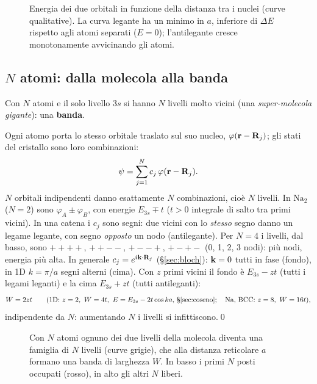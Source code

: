 \documentclass[11pt,a4paper]{article}
\begin{document}
\begin{figure}[tbp]
\centering
{}
\caption{Energia dei due orbitali in funzione della distanza tra i nuclei (curve qualitative). La curva legante ha un minimo in $a$, inferiore
di $\Delta E$ rispetto agli atomi separati ($E=0$); l'antilegante cresce monotonamente avvicinando gli atomi.}\label{fig:na2e}
\end{figure}

\subsection{$N$ atomi: dalla molecola alla banda}
Con $N$ atomi e il solo livello $3s$ si hanno $N$ livelli molto vicini (una \emph{super-molecola gigante}): una \textbf{banda}.

\begin{dimostrazione}[da $N$ orbitali atomici a una banda di larghezza $W=2zt$]
Ogni atomo porta lo stesso orbitale traslato sul suo nucleo, $\varphi(\mathbf r-\mathbf R_j)$; gli stati del cristallo sono loro combinazioni:
\[
\psi=\sum_{j=1}^{N}c_j\,\varphi(\mathbf r-\mathbf R_j).
\]
$N$ orbitali indipendenti danno esattamente $N$ combinazioni, cioè $N$ livelli. In $\mathrm{Na_2}$ ($N=2$) sono $\varphi_A\pm\varphi_B$, con energie
$E_{3s}\mp t$ ($t>0$ integrale di salto tra primi vicini).
In una catena i $c_j$ sono segni: due vicini con lo \emph{stesso} segno danno un legame legante, con segno \emph{opposto} un nodo (antilegante). Per $N=4$
i livelli, dal basso, sono $+{+}{+}{+}$, $+{+}{-}{-}$, $+{-}{-}{+}$, $+{-}{+}{-}$ (0, 1, 2, 3 nodi): più nodi, energia più alta. In generale
$c_j=e^{i\mathbf k\cdot\mathbf R_j}$ (§\ref{sec:bloch}): $\mathbf k=0$ tutti in fase (fondo), in 1D $k=\pi/a$ segni alterni (cima).
Con $z$ primi vicini il fondo è $E_{3s}-zt$ (tutti i legami leganti) e la cima $E_{3s}+zt$ (tutti antileganti):
\[
W=2zt\qquad(\text{1D: }z=2,\ W=4t,\ E=E_{3s}-2t\cos ka\text{, §\ref{sec:coseno}};\quad\text{Na, BCC: }z=8,\ W=16t),
\]
indipendente da $N$: aumentando $N$ i livelli si infittiscono.\qed
\end{dimostrazione}

\begin{figure}[tbp]
\centering
{}
\caption{Con $N$ atomi ognuno dei due livelli della molecola diventa una famiglia di $N$ livelli (curve grigie), che alla distanza reticolare $a$
formano una banda di larghezza $W$. In basso i primi $N$ posti occupati (rosso), in alto gli altri $N$ liberi.}
\end{figure}
\end{document}
